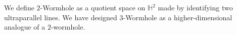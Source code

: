 

We define $2$-Wormhole as a quotient space on $\mathbb{H}^2$ made by identifying two ultraparallel lines. We have designed $3$-Wormhole as a higher-dimensional analogue of a $2$-wormhole. %

